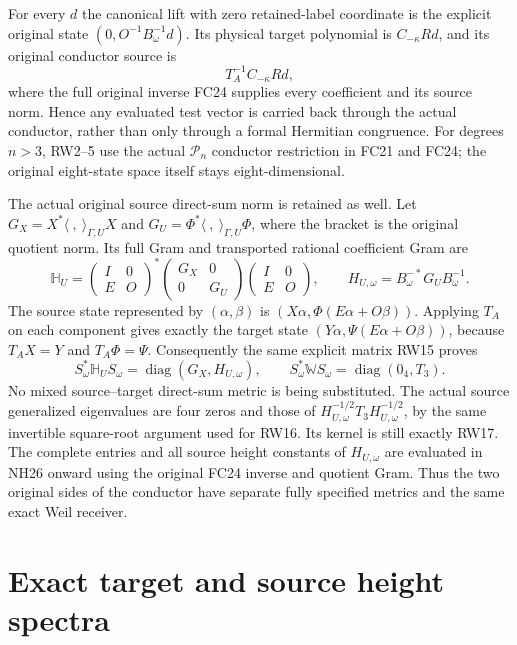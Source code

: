 \documentclass[11pt]{article}
\newcommand{\diag}{\operatorname{diag}}
\begin{document}
For every $d$ the canonical lift with zero retained-label
coordinate is the explicit original state
$(0,O^{-1}B_\omega^{-1}d)$. Its physical target polynomial is
$C_{-\kappa}Rd$, and its original conductor source is
\[
 T_A^{-1}C_{-\kappa}Rd,
 \tag{RW18}
\]
where the full original inverse FC24 supplies every coefficient
and its source norm. Hence any evaluated test vector is carried
back through the actual conductor, rather than only through a
formal Hermitian congruence. For degrees $n>3$, RW2--5 use the
actual $\mathcal P_n$ conductor restriction in FC21 and FC24;
the original eight-state space itself stays eight-dimensional.

The actual original source direct-sum norm is retained as well.
Let $G_X=X^*\langle\ ,\ \rangle_{\Gamma,U}X$ and
$G_U=\Phi^*\langle\ ,\ \rangle_{\Gamma,U}\Phi$, where the
bracket is the original quotient norm. Its full Gram and
transported rational coefficient Gram are
\[
 \mathbb H_U=
 \begin{pmatrix}I&0\\E&O\end{pmatrix}^{\!*}
 \begin{pmatrix}G_X&0\\0&G_U\end{pmatrix}
 \begin{pmatrix}I&0\\E&O\end{pmatrix},\qquad
 H_{U,\omega}=B_\omega^{-*}G_UB_\omega^{-1}.
 \tag{RW19}
\]
The source state represented by $(\alpha,\beta)$ is
$(X\alpha,\Phi(E\alpha+O\beta))$. Applying $T_A$ on
each component gives exactly the target state
$(Y\alpha,\Psi(E\alpha+O\beta))$, because
$T_AX=Y$ and $T_A\Phi=\Psi$.
Consequently the same explicit matrix RW15 proves
\[
 S_\omega^*\mathbb H_U S_\omega=\diag(G_X,H_{U,\omega}),
 \qquad
 S_\omega^*\mathbb W S_\omega=\diag(0_4,T_3).
 \tag{RW20}
\]
No mixed source--target direct-sum metric is being substituted.
The actual source generalized eigenvalues are four zeros and
those of $H_{U,\omega}^{-1/2}T_3H_{U,\omega}^{-1/2}$, by
the same invertible square-root argument used for RW16.
Its kernel is still exactly RW17. The complete entries and
all source height constants of $H_{U,\omega}$ are evaluated
in NH26 onward using the original FC24 inverse and quotient
Gram. Thus the two original sides of the conductor have
separate fully specified metrics and the same exact Weil receiver.

\section{Exact target and source height spectra}
\end{document}

